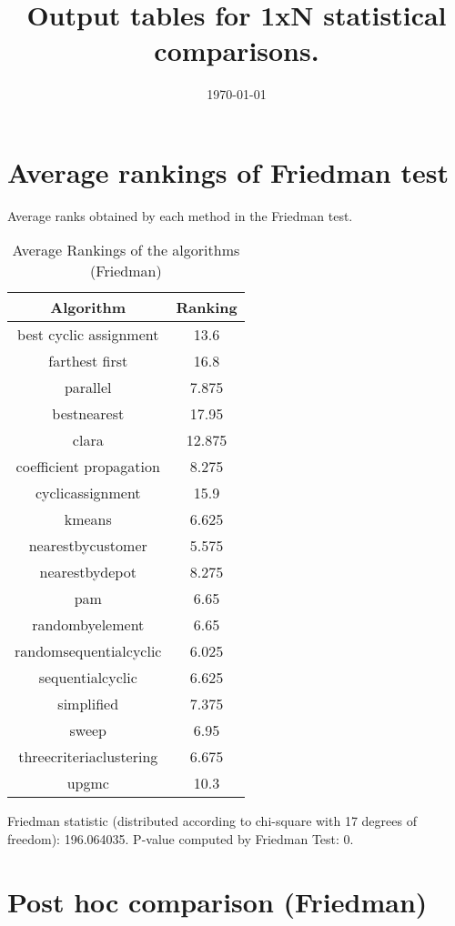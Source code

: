 \documentclass[a4paper,10pt]{article}
\title{Output tables for 1xN statistical comparisons.}
\author{}
\date{\today}
\begin{document}
\begin{landscape}
\pagestyle{empty}
\maketitle
\thispagestyle{empty}

\section{Average rankings of Friedman test}


Average ranks obtained by each method in the Friedman test.

\begin{table}[!htp]
\centering
\begin{tabular}{|c|c|}\hline
Algorithm&Ranking\\\hline
best cyclic assignment&13.6\\farthest first&16.8\\parallel&7.875\\bestnearest&17.95\\clara&12.875\\coefficient propagation&8.275\\cyclicassignment&15.9\\kmeans&6.625\\nearestbycustomer&5.575\\nearestbydepot&8.275\\pam&6.65\\randombyelement&6.65\\randomsequentialcyclic&6.025\\sequentialcyclic&6.625\\simplified&7.375\\sweep&6.95\\threecriteriaclustering&6.675\\upgmc&10.3\\\hline\end{tabular}
\caption{Average Rankings of the algorithms (Friedman)}
\end{table}

Friedman statistic (distributed according to chi-square with 17 degrees of freedom): 196.064035. \newline P-value computed by Friedman Test: 0.\newline


\newpage

\section{Post hoc comparison (Friedman)}



\end{landscape}
\end{document}
